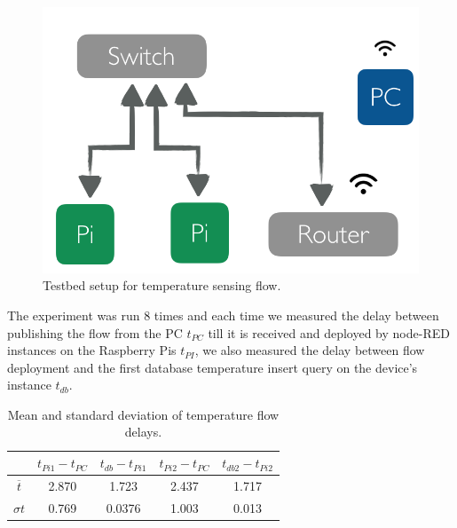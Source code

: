  \begin{figure}[H]
	\centering
	\includegraphics[scale=0.6]{images/tb-temp.png}
	\caption{Testbed setup for temperature sensing flow.}
	\label{fig:tb-temp}
\end{figure} 

\noindent The experiment was run 8 times and each time  we measured the delay between publishing the flow from the PC $ t_{PC}$ till it is received and deployed by  node-RED instances on the Raspberry Pis $t_{PI}$, we also measured the delay between flow deployment and the first database temperature insert query on the device's instance $t_{db}$. 
\begin{table}[H]
	\centering
	\begin{tabular}{c|c|c|c|c}\toprule
		&  $ t_{Pi1} - t_{PC}$   & $t_{db} - t_{Pi1}$  & $ t_{Pi2} - t_{PC}$ &  $t_{db2} - t_{Pi2}$ \\ \midrule
$ \overline{t} $ &2.870&	1.723&	2.437&	1.717\\
$ \sigma t $& 0.769	&0.0376&	1.003&	0.013\\
	\end{tabular}
	\caption{Mean and standard deviation of temperature flow delays.}
	\label{table:temp}
\end{table}

